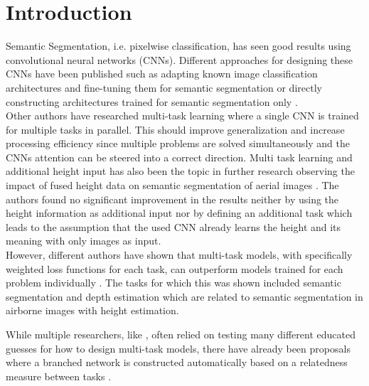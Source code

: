 \section{Introduction}

Semantic Segmentation, i.e. pixelwise classification, has seen good results using convolutional neural networks
(CNNs). Different approaches for designing these CNNs have been published such as adapting known image classification
architectures and fine-tuning them for semantic segmentation \parencite{2017-shelhamer-fully} or directly
constructing architectures trained for semantic segmentation only \parencite{2016-jegou-the}.\\

Other authors have researched multi-task learning \parencite{2018-kendall-multi} where a single CNN is trained
for multiple tasks in parallel. This should improve generalization and increase processing efficiency since multiple
problems are solved simultaneously and the CNNs attention can be steered into a correct direction.
Multi task learning and additional height input has also been the topic in further research observing the impact
of fused height data on semantic segmentation of aerial images \parencite{2019-schmitz-semantic}. The authors found
no significant improvement in the results neither by using the height information as additional input nor by defining
an additional task which leads to the assumption that the used CNN already learns the height and its meaning with only
images as input. \\

However, different authors have shown that multi-task models, with specifically weighted loss functions for each task,
can outperform models trained for each problem individually \parencite{2018-kendall-multi}. 
The tasks for which this was shown included semantic segmentation and depth estimation which are 
related to semantic segmentation in airborne
images with height estimation.

While multiple researchers, like \textcite{2019-schmitz-semantic}, often relied on testing many different educated 
guesses for
how to design multi-task models, there have already been proposals where a branched network
is constructed automatically based on a relatedness measure between tasks \parencite{2019-vandenhende-branched}.\\

